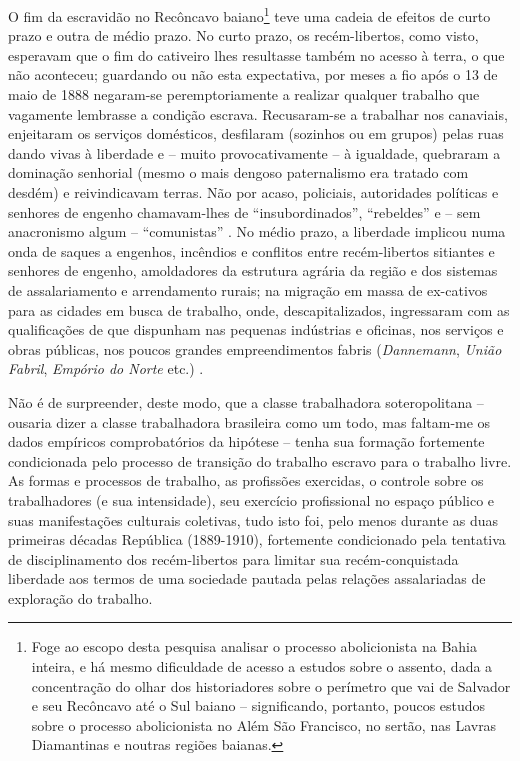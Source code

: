 O fim da escravidão no Recôncavo baiano\footnote{Foge ao escopo desta pesquisa analisar o processo abolicionista na Bahia inteira, e há mesmo dificuldade de acesso a estudos sobre o assento, dada a concentração do olhar dos historiadores sobre o perímetro que vai de Salvador e seu Recôncavo até o Sul baiano -- significando, portanto, poucos estudos sobre o processo abolicionista no Além São Francisco, no sertão, nas Lavras Diamantinas e noutras regiões baianas.} teve uma cadeia de efeitos de curto prazo e outra de médio prazo. No curto prazo, os recém-libertos, como visto, esperavam que o fim do cativeiro lhes resultasse também no acesso à terra, o que não aconteceu; guardando ou não esta expectativa, por meses a fio após o 13 de maio de 1888 negaram-se peremptoriamente a realizar qualquer trabalho que vagamente lembrasse a condição escrava. Recusaram-se a trabalhar nos canaviais, enjeitaram os serviços domésticos, desfilaram (sozinhos ou em grupos) pelas ruas dando vivas à liberdade e -- muito provocativamente -- à igualdade, quebraram a dominação senhorial (mesmo o mais dengoso paternalismo era tratado com desdém) e reivindicavam terras. Não por acaso, policiais, autoridades políticas e senhores de engenho chamavam-lhes de ``insubordinados'', ``rebeldes'' e -- sem anacronismo algum -- ``comunistas'' \cite[p.~119-160]{fraga_encruzilhadas_2014}. No médio prazo, a liberdade implicou numa onda de saques a engenhos, incêndios e conflitos entre recém-libertos sitiantes e senhores de engenho, amoldadores da estrutura agrária da região e dos sistemas de assalariamento e arrendamento rurais; na migração em massa de ex-cativos para as cidades em busca de trabalho, onde, descapitalizados, ingressaram com as qualificações de que dispunham nas pequenas indústrias e oficinas, nos serviços e obras públicas, nos poucos grandes empreendimentos fabris (\textit{Dannemann}, \textit{União Fabril}, \textit{Empório do Norte} etc.) \cite[p.~161-241]{fraga_encruzilhadas_2014}.

Não é de surpreender, deste modo, que a classe trabalhadora soteropolitana -- ousaria dizer a classe trabalhadora brasileira como um todo, mas faltam-me os dados empíricos comprobatórios da hipótese -- tenha sua formação fortemente condicionada pelo processo de transição do trabalho escravo para o trabalho livre. As formas e processos de trabalho, as profissões exercidas, o controle sobre os trabalhadores (e sua intensidade), seu exercício profissional no espaço público e suas manifestações culturais coletivas, tudo isto foi, pelo menos durante as duas primeiras décadas República (1889-1910), fortemente condicionado pela tentativa de disciplinamento dos recém-libertos para limitar sua recém-conquistada liberdade aos termos de uma sociedade pautada pelas relações assalariadas de exploração do trabalho.

